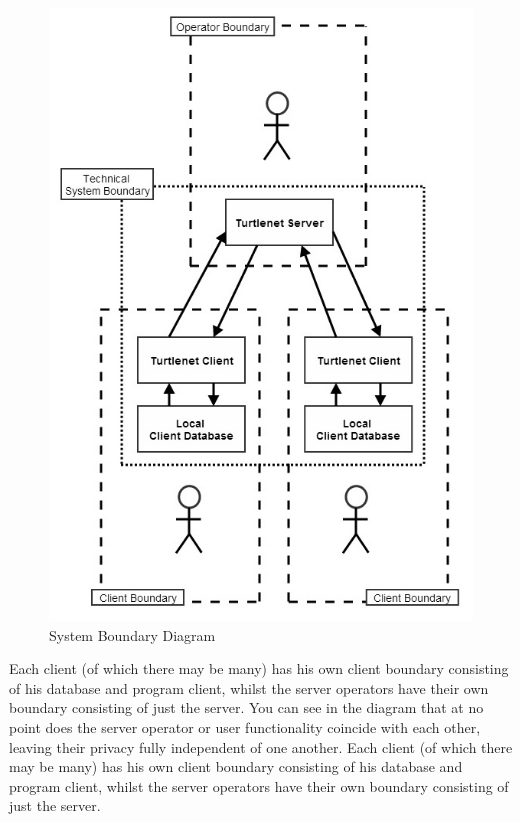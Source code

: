 \begin{figure}[h]
    \centering
    \includegraphics[width=\textwidth]{images/requirements/systemboundarydiagram.jpg}
    \caption{System Boundary Diagram}
    \label{fig:sbd_diag}
\end{figure}

Each client (of which there may be many) has his own client boundary consisting 
of his database and program client, whilst the server operators have their own 
boundary consisting of just the server. You can see in the diagram that at no 
point does the server operator or user functionality coincide with each other, 
leaving their privacy fully independent of one another. Each client (of which 
there may be many) has his own client boundary consisting of his database and 
program client, whilst the server operators have their own boundary consisting 
of just the server.